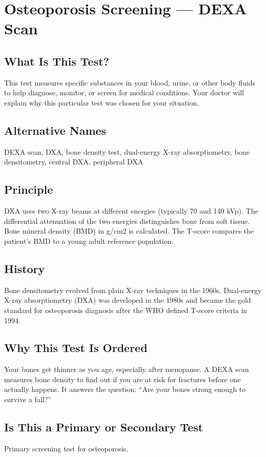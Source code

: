 \chapter{Osteoporosis Screening --- DEXA Scan}

\section*{What Is This Test?}
This test measures specific substances in your blood, urine, or other body fluids to help diagnose, monitor, or screen for medical conditions. Your doctor will explain why this particular test was chosen for your situation.

\section*{Alternative Names}
DEXA scan, DXA, bone density test, dual-energy X-ray absorptiometry, bone densitometry, central DXA, peripheral DXA


\section*{Principle}
DXA uses two X-ray beams at different energies (typically 70 and 140 kVp). The differential attenuation of the two energies distinguishes bone from soft tissue. Bone mineral density (BMD) in g/cm2 is calculated. The T-score compares the patient's BMD to a young adult reference population.

\section*{History}
Bone densitometry evolved from plain X-ray techniques in the 1960s. Dual-energy X-ray absorptiometry (DXA) was developed in the 1980s and became the gold standard for osteoporosis diagnosis after the WHO defined T-score criteria in 1994.

\section*{Why This Test Is Ordered}
Your bones get thinner as you age, especially after menopause. A DEXA scan measures bone density to find out if you are at risk for fractures before one actually happens. It answers the question: ``Are your bones strong enough to survive a fall?''

\section*{Is This a Primary or Secondary Test}
Primary screening test for osteoporosis.

